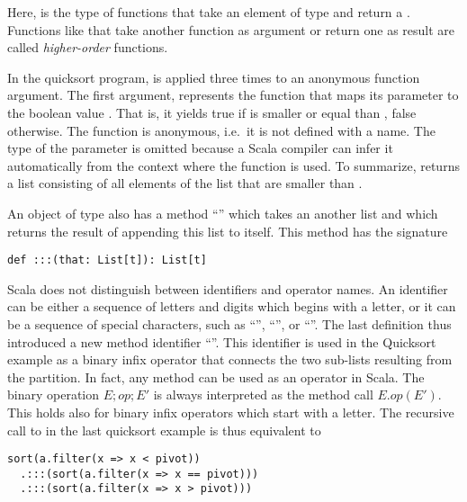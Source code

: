 Here,  is the type of functions that take an element
of type  and return a .  Functions like
 that take another function as argument or return one as
result are called {\em higher-order} functions.

In the quicksort program,  is applied three times to an
anonymous function argument.  The first argument,
 represents the function that maps its parameter
 to the boolean value . That is, it yields
true if  is smaller or equal than , false
otherwise. The function is anonymous, i.e.\ it is not defined with a
name. The type of the  parameter is omitted because a Scala
compiler can infer it automatically from the context where the
function is used. To summarize, 
returns a list consisting of all elements of the list  that are
smaller than .


An object of type  also has a method ``\code{:::}''
which takes an another list and which returns the result of appending this
list to itself. This method has the signature

\begin{lstlisting}
def :::(that: List[t]): List[t]
\end{lstlisting}

Scala does not distinguish between identifiers and operator names. An
identifier can be either a sequence of letters and digits which begins
with a letter, or it can be a sequence of special characters, such as
``\code{+}'', ``\code{*}'', or ``\code{:}''.  The last definition thus
introduced a new method identifier ``\code{:::}''.  This identifier is
used in the Quicksort example as a binary infix operator that connects
the two sub-lists resulting from the partition. In fact, any method
can be used as an operator in Scala.  The binary operation $E;op;E'$
is always interpreted as the method call $E.op(E')$. This holds also
for binary infix operators which start with a letter. The recursive call
to  in the last quicksort example is thus equivalent to
\begin{lstlisting}
sort(a.filter(x => x < pivot))
  .:::(sort(a.filter(x => x == pivot)))
  .:::(sort(a.filter(x => x > pivot)))
\end{lstlisting}


